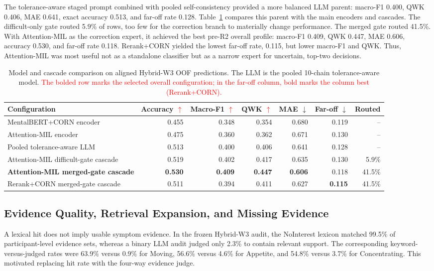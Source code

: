 \documentclass{article}
\DeclareRobustCommand{\rev}[1]{\textcolor{red}{#1}}
\newcommand{\best}[1]{\textbf{#1}}
\begin{document}
The tolerance-aware staged prompt combined with pooled self-consistency provided a more balanced LLM parent: macro-F1 0.400, QWK 0.406, MAE 0.641, exact accuracy 0.513, and far-off rate 0.128. Table~\ref{tab:models} compares this parent with the main encoders and cascades. The difficult-only gate routed 5.9\% of rows, too few for the correction branch to materially change performance. The merged gate routed 41.5\%. With Attention-MIL as the correction expert, it achieved the best pre-R2 overall profile: macro-F1 0.409, QWK 0.447, MAE 0.606, accuracy 0.530, and far-off rate 0.118. Rerank+CORN yielded the lowest far-off rate, 0.115, but lower macro-F1 and QWK. Thus, Attention-MIL was most useful not as a standalone classifier but as a narrow expert for uncertain, top-two decisions.

\begin{table}[t]
  \caption{Model and cascade comparison on aligned Hybrid-W3 OOF predictions. The LLM is the pooled 10-chain tolerance-aware model. \rev{The bolded row marks the selected overall configuration; in the far-off column, bold marks the column best (Rerank+CORN).}}
  \label{tab:models}
  \centering
  \scriptsize
  \begin{tabular}{lrrrrrr}
    \toprule
    Configuration & Accuracy\rev{ $\uparrow$} & Macro-F1\rev{ $\uparrow$} & QWK\rev{ $\uparrow$} & MAE $\downarrow$ & Far-off $\downarrow$ & Routed \\
    \midrule
    MentalBERT+CORN encoder & 0.455 & 0.348 & 0.354 & 0.680 & 0.119 & -- \\
    Attention-MIL encoder & 0.475 & 0.360 & 0.362 & 0.671 & 0.130 & -- \\
    Pooled tolerance-aware LLM & 0.513 & 0.400 & 0.406 & 0.641 & 0.128 & -- \\
    Attention-MIL difficult-gate cascade & 0.519 & 0.402 & 0.417 & 0.635 & 0.130 & 5.9\% \\
    \best{Attention-MIL merged-gate cascade} & \best{0.530} & \best{0.409} & \best{0.447} & \best{0.606} & 0.118 & 41.5\% \\
    Rerank+CORN merged-gate cascade & 0.511 & 0.394 & 0.411 & 0.627 & \best{0.115} & 41.5\% \\
    \bottomrule
  \end{tabular}
\end{table}

\subsection{Evidence Quality, Retrieval Expansion, and Missing Evidence}
\label{subsec:evidence-results}
A lexical hit does not imply usable symptom evidence. In the frozen Hybrid-W3 audit, the NoInterest lexicon matched 99.5\% of participant-level evidence sets, whereas a binary LLM audit judged only 2.3\% to contain relevant support. The corresponding keyword-versus-judged rates were 63.9\% versus 0.9\% for Moving, 56.6\% versus 4.6\% for Appetite, and 54.8\% versus 3.7\% for Concentrating. This motivated replacing hit rate with the four-way evidence judge.
\end{document}
